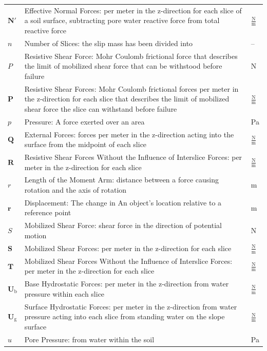 \documentclass[12pt]{article}
\begin{document}
\begin{longtabu}{l X[l] l}
\\
$\mathbf{N'}$ & Effective Normal Forces: per meter in the z-direction for each slice of a soil surface, subtracting pore water reactive force from total reactive force & $\frac{\text{N}}{\text{m}}$
\\
$n$ & Number of Slices: the slip mass has been divided into & --
\\
$P$ & Resistive Shear Force: Mohr Coulomb frictional force that describes the limit of mobilized shear force that can be withstood before failure & N
\\
$\mathbf{P}$ & Resistive Shear Forces: Mohr Coulomb frictional forces per meter in the z-direction for each slice that describes the limit of mobilized shear force the slice can withstand before failure & $\frac{\text{N}}{\text{m}}$
\\
$p$ & Pressure: A force exerted over an area & Pa
\\
$\mathbf{Q}$ & External Forces: forces per meter in the z-direction acting into the surface from the midpoint of each slice & $\frac{\text{N}}{\text{m}}$
\\
$\mathbf{R}$ & Resistive Shear Forces Without the Influence of Interslice Forces: per meter in the z-direction for each slice & $\frac{\text{N}}{\text{m}}$
\\
$r$ & Length of the Moment Arm: distance between a force causing rotation and the axis of rotation & m
\\
$\mathbf{r}$ & Displacement: The change in An object's location relative to a reference point & m
\\
$S$ & Mobilized Shear Force: shear force in the direction of potential motion & N
\\
$\mathbf{S}$ & Mobilized Shear Forces: per meter in the z-direction for each slice & $\frac{\text{N}}{\text{m}}$
\\
$\mathbf{T}$ & Mobilized Shear Forces Without the Influence of Interslice Forces: per meter in the z-direction for each slice & $\frac{\text{N}}{\text{m}}$
\\
${\mathbf{U}_{\text{b}}}$ & Base Hydrostatic Forces: per meter in the z-direction from water pressure within each slice & $\frac{\text{N}}{\text{m}}$
\\
${\mathbf{U}_{\text{g}}}$ & Surface Hydrostatic Forces: per meter in the z-direction from water pressure acting into each slice from standing water on the slope surface & $\frac{\text{N}}{\text{m}}$
\\
$u$ & Pore Pressure: from water within the soil & Pa

\end{longtabu}
\end{document}
